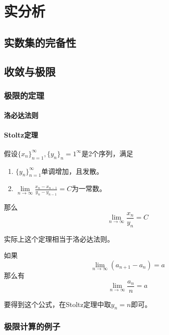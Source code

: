 \chapter{实分析}

\section{实数集的完备性}

\section{收敛与极限}
\subsection{极限的定理}
\subsubsection{洛必达法则}

\subsubsection{Stoltz定理}
\begin{theorem}[Stoltz定理]
假设$\{x_n\}_{n=1}^\infty,\{y_n\}_n=1^\infty$是2个序列，满足
\begin{enumerate}
\item $\{y_n\}_{n=1}^\infty$单调增加，且发散。
\item $\lim\limits_{n\rightarrow\infty}\frac{x_n-x_{n-1}}{y_n-y_{n-1}}=C$为一常数。
\end{enumerate}
那么
$$\lim\limits_{n\rightarrow\infty}\frac{x_n}{y_n}=C$$

实际上这个定理相当于洛必达法则。
\end{theorem}
\begin{lemma}[等差数列均值的极限]\label{Stoltz-l1}
如果
$$\lim_{n\rightarrow\infty} (a_{n+1}-a_n)=a$$
那么有
$$\lim_{n\rightarrow\infty}\frac{a_n}{n}=a$$

要得到这个公式，在Stoltz定理中取$y_n=n$即可。
\end{lemma}
\subsection{极限计算的例子}
